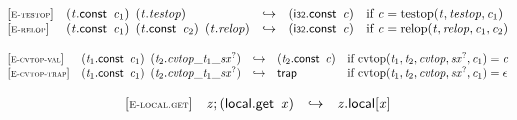 \vspace{1ex}

$$
\begin{array}{@{}l@{}lcl@{}l@{}}
{[\textsc{\scriptsize E{-}testop}]} \quad & ({\mathit{t}}.\mathsf{const}~\,{\mathit{c}}_{{1}})~\,({\mathit{t}} . {\mathit{testop}}) &\hookrightarrow& (\mathsf{i{\scriptstyle32}}.\mathsf{const}~\,{\mathit{c}}) &\quad
  \mbox{if}~{\mathit{c}} = {\mathrm{testop}}({\mathit{t}}, {\mathit{testop}}, {\mathit{c}}_{{1}}) \\
{[\textsc{\scriptsize E{-}relop}]} \quad & ({\mathit{t}}.\mathsf{const}~\,{\mathit{c}}_{{1}})~\,({\mathit{t}}.\mathsf{const}~\,{\mathit{c}}_{{2}})~\,({\mathit{t}} . {\mathit{relop}}) &\hookrightarrow& (\mathsf{i{\scriptstyle32}}.\mathsf{const}~\,{\mathit{c}}) &\quad
  \mbox{if}~{\mathit{c}} = {\mathrm{relop}}({\mathit{t}}, {\mathit{relop}}, {\mathit{c}}_{{1}}, {\mathit{c}}_{{2}}) \\
\end{array}
$$

\vspace{1ex}

$$
\begin{array}{@{}l@{}lcl@{}l@{}}
{[\textsc{\scriptsize E{-}cvtop{-}val}]} \quad & ({\mathit{t}}_{{1}}.\mathsf{const}~\,{\mathit{c}}_{{1}})~\,({\mathit{t}}_{{2}} . {{{{{\mathit{cvtop}}}{\mathsf{\_}}}{{\mathit{t}}_{{1}}}}{\mathsf{\_}}}{{{\mathit{sx}}^?}}) &\hookrightarrow& ({\mathit{t}}_{{2}}.\mathsf{const}~\,{\mathit{c}}) &\quad
  \mbox{if}~{\mathrm{cvtop}}({\mathit{t}}_{{1}}, {\mathit{t}}_{{2}}, {\mathit{cvtop}}, {{\mathit{sx}}^?}, {\mathit{c}}_{{1}}) = {\mathit{c}} \\
{[\textsc{\scriptsize E{-}cvtop{-}trap}]} \quad & ({\mathit{t}}_{{1}}.\mathsf{const}~\,{\mathit{c}}_{{1}})~\,({\mathit{t}}_{{2}} . {{{{{\mathit{cvtop}}}{\mathsf{\_}}}{{\mathit{t}}_{{1}}}}{\mathsf{\_}}}{{{\mathit{sx}}^?}}) &\hookrightarrow& \mathsf{trap} &\quad
  \mbox{if}~{\mathrm{cvtop}}({\mathit{t}}_{{1}}, {\mathit{t}}_{{2}}, {\mathit{cvtop}}, {{\mathit{sx}}^?}, {\mathit{c}}_{{1}}) = \epsilon \\
\end{array}
$$

\vspace{1ex}

$$
\begin{array}{@{}l@{}lcl@{}l@{}}
{[\textsc{\scriptsize E{-}local.get}]} \quad & {\mathit{z}} ; (\mathsf{local.get}~\,{\mathit{x}}) &\hookrightarrow& {{\mathit{z}}.\mathsf{local}}{{}[{\mathit{x}}]} &  \\
\end{array}
$$

